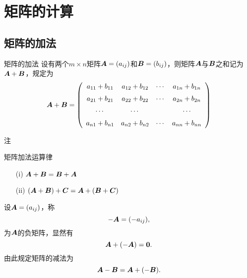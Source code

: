 \section{矩阵的计算}
\subsection{矩阵的加法}
\begin{frame}
  \begin{footnotesize}
    
    \begin{block}{矩阵的加法}
      设有两个$m\times n$矩阵$\boldsymbol{A}=(a_{ij})$和$\boldsymbol{B}=(b_{ij})$，则矩阵$\boldsymbol{A}$与$\boldsymbol{B}$之和记为$\boldsymbol{A}+\boldsymbol{B}$，规定为
      $$
      \boldsymbol{A} + \boldsymbol{B} = 
      \left(
        \begin{array}{cccc}
          a_{11} + b_{11}  & a_{12} + b_{12}  & \cdots & a_{1n} + b_{1n}  \\[0.2cm]
          a_{21} + b_{21}  & a_{22} + b_{22}  & \cdots & a_{2n} + b_{2n}  \\[0.2cm]
          \cdots            & \cdots            &     & \cdots            \\[0.2cm]
          a_{n1} + b_{n1}  & a_{n2} + b_{n2}  & \cdots & a_{nn} + b_{nn}  
        \end{array}
      \right)
      $$
    \end{block}
    \pause
    \begin{block}{注}
    \end{block}

    


  \end{footnotesize}
\end{frame}


\begin{frame}
  \begin{footnotesize}
    \begin{block}{矩阵加法运算律}
      \begin{itemize}
      \item[(i)] $\boldsymbol{A} + \boldsymbol{B} = \boldsymbol{B} + \boldsymbol{A}$\\[0.2cm]
      \item[(ii)] $(\boldsymbol{A} + \boldsymbol{B}) + \boldsymbol{C} = \boldsymbol{A} + (\boldsymbol{B} + \boldsymbol{C})$ 
      \end{itemize}
    \end{block}

    \vspace{0.1in}
    \pause 
    设$\boldsymbol{A} = (a_{ij})$，称
    $$
    -\boldsymbol{A} = (-a_{ij}),
    $$
    为$\boldsymbol{A}$的负矩阵，显然有
    $$
    \boldsymbol{A} + (-\boldsymbol{A}) = \mathbf{0}.
    $$
    由此规定矩阵的减法为
    $$
    \boldsymbol{A} - \boldsymbol{B} = \boldsymbol{A} + (-\boldsymbol{B}).
    $$
  \end{footnotesize}
\end{frame}

